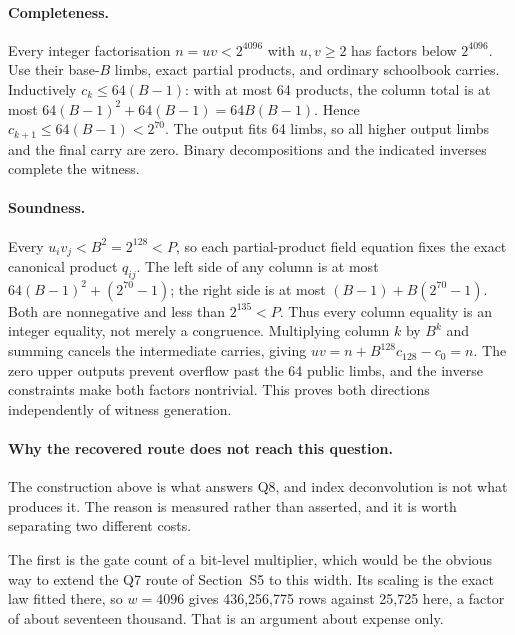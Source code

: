 \documentclass[11pt,a4paper]{article}
\begin{document}
\paragraph{Completeness.}
Every integer factorisation $n=uv<2^{4096}$ with $u,v\ge2$ has factors below
$2^{4096}$. Use their base-$B$ limbs, exact partial products, and ordinary
schoolbook carries. Inductively $c_k\le64(B-1)$: with at most 64 products,
the column total is at most
$64(B-1)^2+64(B-1)=64B(B-1)$. Hence $c_{k+1}\le64(B-1)<2^{70}$.
The output fits 64 limbs, so all higher output limbs and the final carry are
zero. Binary decompositions and the indicated inverses complete the witness.

\paragraph{Soundness.}
Every $u_iv_j<B^2=2^{128}<P$, so each partial-product field equation fixes
the exact canonical product $q_{ij}$. The left side of any column is at most
$64(B-1)^2+(2^{70}-1)$; the right side is at most
$(B-1)+B(2^{70}-1)$. Both are nonnegative and less than $2^{135}<P$.
Thus every column equality is an integer equality, not merely a congruence.
Multiplying column $k$ by $B^k$ and summing cancels the intermediate carries,
giving $uv=n+B^{128}c_{128}-c_0=n$. The zero upper outputs prevent overflow
past the 64 public limbs, and the inverse constraints make both factors
nontrivial. This proves both directions independently of witness generation.

\paragraph{Why the recovered route does not reach this question.}
The construction above is what answers Q8, and index deconvolution is not what
produces it. The reason is measured rather than asserted, and it is worth
separating two different costs.

The first is the gate count of a bit-level multiplier, which would be the
obvious way to extend the Q7 route of Section~S5 to this width. Its scaling is
the exact law fitted there, so $w=4096$ gives 436{,}256{,}775 rows against
25{,}725 here, a factor of about seventeen thousand. That is an argument about
expense only.
\end{document}
